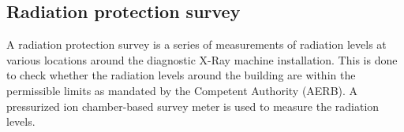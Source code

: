 \subsection{Radiation protection survey}
A radiation protection survey is a series of measurements of radiation levels at various locations around the diagnostic X-Ray machine installation. This is done to check whether the radiation levels around the building are within the permissible limits as mandated by the Competent Authority (AERB). A pressurized ion chamber-based survey meter is used to measure the radiation levels.